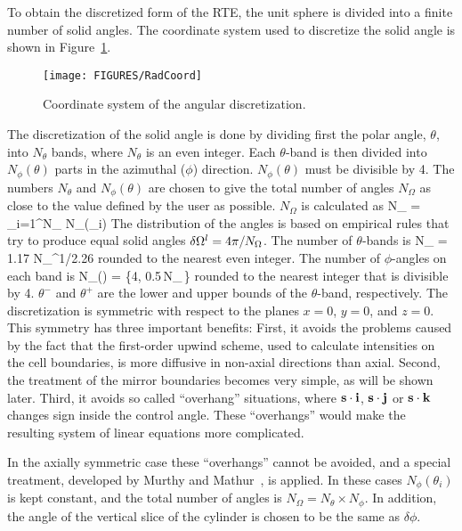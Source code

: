 To obtain the discretized form of the RTE, the unit sphere is divided into a finite number of solid angles.
The coordinate system used to discretize the solid angle is
shown in Figure~\ref{Angular}.
\begin{figure}[ht]
\begin{center}
\texttt{[image: FIGURES/RadCoord]}
\caption{Coordinate system of the angular discretization.}
\label{Angular}
\end{center}
\end{figure}
The discretization of the solid angle is done by dividing first
the polar angle, $\theta$, into $N_{\theta}$ bands, where
$N_{\theta}$ is an even integer.
Each $\theta$-band is then divided into
$N_{\phi}(\theta)$ parts in the azimuthal ($\phi$) direction.
$N_{\phi}(\theta)$ must be divisible by 4.
The numbers $N_{\theta}$ and $N_{\phi}(\theta)$ are chosen
to give the total number of angles $N_{\Omega}$ as close to
the value defined by the user as possible.
$N_{\Omega}$ is calculated as
\be
 N_{\Omega} = \sum_{i=1}^{N_{\theta}} N_{\phi}(\theta_i)
\ee
The distribution of the angles is based on empirical rules that try
to produce equal solid angles $\delta {\Omega}^l = 4\pi/N_{\Omega}$. The
number of $\theta$-bands is
\be
 N_{\theta} = 1.17 \; N_{\Omega}^{1/2.26}
\ee
rounded to the nearest even integer. The number of $\phi$-angles
on each band is
\be
 N_{\phi}(\theta) = \max\left\{4,
        0.5\,N_{\Omega}\,\left[\cos(\theta^-)-\cos(\theta^+)\right]\right\}
\ee
rounded to the nearest integer that is divisible by 4.
$\theta^-$ and $\theta^+$ are
the lower and upper bounds of the $\theta$-band, respectively.
The discretization is symmetric with respect to the planes $x=0$, $y=0$, and
$z=0$. This symmetry has three important benefits:
First, it avoids the problems caused by the fact that the first-order
upwind scheme, used to calculate intensities on the cell boundaries,
is more diffusive in non-axial directions than axial.
Second, the treatment of the mirror boundaries becomes very simple, as
will be shown later. Third,
it avoids so called
``overhang'' situations, where ${\mathbf{s}}\cdot {\bf i}$, ${\mathbf{s}}\cdot {\bf j}$
or ${\mathbf{s}}\cdot {\bf k}$ changes sign inside
the control angle. These ``overhangs'' would make the resulting system of
linear equations more complicated.

In the axially symmetric case these ``overhangs'' cannot be avoided, and a
special treatment, developed by Murthy and Mathur~\cite{Murthy}, is
applied. In these cases $N_{\phi}(\theta_i)$ is kept constant, and
the total number of angles is $N_{\Omega} = N_{\theta} \times
N_{\phi}$. In addition, the angle of the vertical slice of the cylinder is
chosen to be the same as $\delta\phi$.




